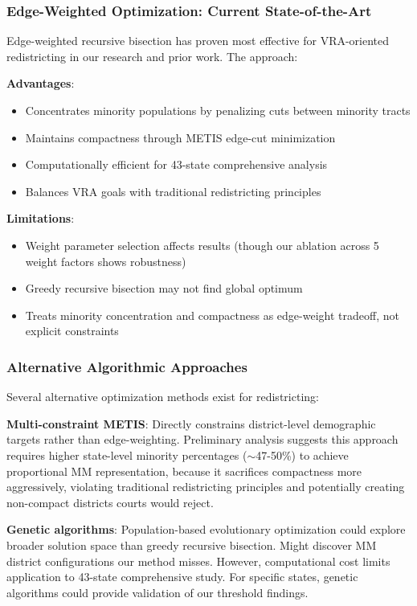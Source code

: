 \subsubsection{Edge-Weighted Optimization: Current State-of-the-Art}

Edge-weighted recursive bisection has proven most effective for VRA-oriented redistricting in our research and prior work. The approach:

\textbf{Advantages}:
\begin{itemize}
    \item Concentrates minority populations by penalizing cuts between minority tracts
    \item Maintains compactness through METIS edge-cut minimization
    \item Computationally efficient for 43-state comprehensive analysis
    \item Balances VRA goals with traditional redistricting principles
\end{itemize}

\textbf{Limitations}:
\begin{itemize}
    \item Weight parameter selection affects results (though our ablation across 5 weight factors shows robustness)
    \item Greedy recursive bisection may not find global optimum
    \item Treats minority concentration and compactness as edge-weight tradeoff, not explicit constraints
\end{itemize}

\subsubsection{Alternative Algorithmic Approaches}

Several alternative optimization methods exist for redistricting:

\textbf{Multi-constraint METIS}: Directly constrains district-level demographic targets rather than edge-weighting. Preliminary analysis suggests this approach requires higher state-level minority percentages ($\sim$47-50\%) to achieve proportional MM representation, because it sacrifices compactness more aggressively, violating traditional redistricting principles and potentially creating non-compact districts courts would reject.

\textbf{Genetic algorithms}: Population-based evolutionary optimization could explore broader solution space than greedy recursive bisection. Might discover MM district configurations our method misses. However, computational cost limits application to 43-state comprehensive study. For specific states, genetic algorithms could provide validation of our threshold findings.

